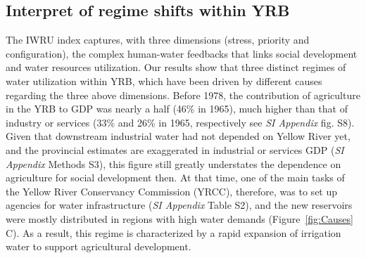 \documentclass[9pt, twocolumn, twoside, lineno]{pnas-new}
\begin{document}
\subsection*{Interpret of regime shifts within YRB}
The IWRU index captures, with three dimensions (stress, priority and configuration), the complex human-water feedbacks that links social development and water resources utilization. 
Our results show that three distinct regimes of water utilization within YRB, which have been driven by different causes regarding the three above dimensions.
Before 1978, the contribution of agriculture in the YRB to GDP was nearly a half (46\% in 1965), much higher than that of industry or services (33\% and 26\% in 1965, respectively see \textit{SI Appendix} fig. S8). 
Given that downstream industrial water had not depended on Yellow River yet, and the provincial estimates are exaggerated in industrial or services GDP (\textit{SI Appendix} Methods S3), this figure still greatly understates the dependence on agriculture for social development then.
At that time, one of the main tasks of the Yellow River Conservancy Commission (YRCC), therefore, was to set up agencies for water infrastructure (\textit{SI Appendix} Table S2), and the new reservoirs were mostly distributed in regions with high water demands (Figure~\ref{fig:Causes} C). 
As a result, this regime is characterized by a rapid expansion of irrigation water to support agricultural development.
\end{document}
